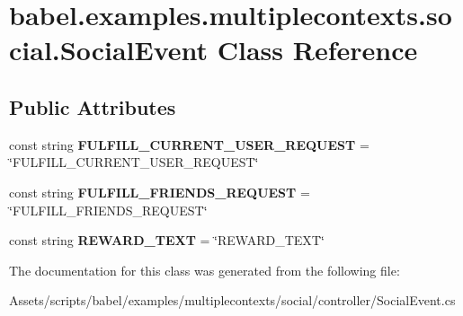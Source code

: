 \hypertarget{classbabel_1_1examples_1_1multiplecontexts_1_1social_1_1_social_event}{\section{babel.\-examples.\-multiplecontexts.\-social.\-Social\-Event Class Reference}
\label{classbabel_1_1examples_1_1multiplecontexts_1_1social_1_1_social_event}
}
\subsection*{Public Attributes}
\begin{DoxyCompactItemize}
\item 
\hypertarget{classbabel_1_1examples_1_1multiplecontexts_1_1social_1_1_social_event_abd3bc2c2ff0c86c68ce03ed643d1cd0d}{const string {\bfseries F\-U\-L\-F\-I\-L\-L\-\_\-\-C\-U\-R\-R\-E\-N\-T\-\_\-\-U\-S\-E\-R\-\_\-\-R\-E\-Q\-U\-E\-S\-T} = \char`\"{}F\-U\-L\-F\-I\-L\-L\-\_\-\-C\-U\-R\-R\-E\-N\-T\-\_\-\-U\-S\-E\-R\-\_\-\-R\-E\-Q\-U\-E\-S\-T\char`\"{}}\label{classbabel_1_1examples_1_1multiplecontexts_1_1social_1_1_social_event_abd3bc2c2ff0c86c68ce03ed643d1cd0d}

\item 
\hypertarget{classbabel_1_1examples_1_1multiplecontexts_1_1social_1_1_social_event_a1065b3be69f763728a92508fb41a5bee}{const string {\bfseries F\-U\-L\-F\-I\-L\-L\-\_\-\-F\-R\-I\-E\-N\-D\-S\-\_\-\-R\-E\-Q\-U\-E\-S\-T} = \char`\"{}F\-U\-L\-F\-I\-L\-L\-\_\-\-F\-R\-I\-E\-N\-D\-S\-\_\-\-R\-E\-Q\-U\-E\-S\-T\char`\"{}}\label{classbabel_1_1examples_1_1multiplecontexts_1_1social_1_1_social_event_a1065b3be69f763728a92508fb41a5bee}

\item 
\hypertarget{classbabel_1_1examples_1_1multiplecontexts_1_1social_1_1_social_event_a62e8d1b39f294eb23002e98764fe024e}{const string {\bfseries R\-E\-W\-A\-R\-D\-\_\-\-T\-E\-X\-T} = \char`\"{}R\-E\-W\-A\-R\-D\-\_\-\-T\-E\-X\-T\char`\"{}}\label{classbabel_1_1examples_1_1multiplecontexts_1_1social_1_1_social_event_a62e8d1b39f294eb23002e98764fe024e}

\end{DoxyCompactItemize}


The documentation for this class was generated from the following file\-:\begin{DoxyCompactItemize}
\item 
Assets/scripts/babel/examples/multiplecontexts/social/controller/Social\-Event.\-cs\end{DoxyCompactItemize}
